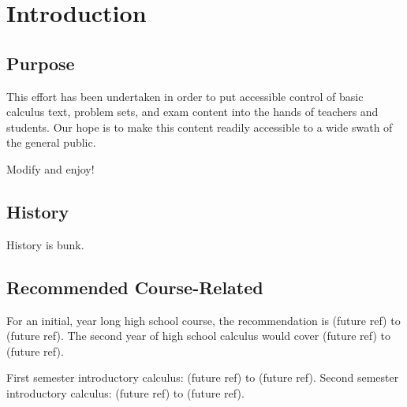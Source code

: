 \chapter{Introduction}

\section{Purpose}
This effort has been undertaken in order to put accessible control of basic calculus text, problem sets, and exam content into the hands of teachers and students.  Our hope is to make this content readily accessible to a wide swath of the general public.

Modify and enjoy!

\section{History}
History is bunk.

\section{Recommended Course-Related}
For an initial, year long high school course, the recommendation is (future ref) to (future ref).
The second year of high school calculus would cover (future ref) to (future ref).

First semester introductory calculus:  (future ref) to (future ref).
Second semester  introductory calculus:  (future ref) to (future ref).
